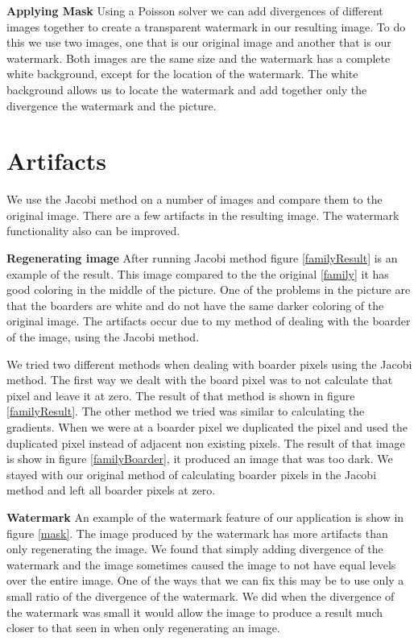 \documentclass[10pt,twopage]{acmsiggraph}
\begin{document}
{\bf Applying Mask} Using a Poisson solver we can add divergences of different images together to create a transparent watermark in our resulting image. To do this we use two images, one that is our original image and another that is our watermark. Both images are the same size and the watermark has a complete white background, except for the location of the watermark. The white background allows us to locate the watermark and add together only the divergence the watermark and the picture.

\section{Artifacts}

We use the Jacobi method on a number of images and compare them to the original image. There are a few artifacts in the resulting image. The watermark functionality also can be improved. 

{\bf Regenerating image} After running Jacobi method figure \ref{familyResult} is an example of the result. This image compared to the the original \ref{family} it has good coloring in the middle of the picture. One of the problems in the picture are that the boarders are white and do not have the same darker coloring of the original image. The artifacts occur due to my method of dealing with the boarder of the image, using the Jacobi method.

We tried two different methods when dealing with boarder pixels using the Jacobi method. The first way we dealt with the board pixel was to not calculate that pixel and leave it at zero. The result of that method is shown in figure \ref{familyResult}. The other method we tried was similar to calculating the gradients. When we were at a boarder pixel we duplicated the pixel and used the duplicated pixel instead of adjacent non existing pixels. The result of that image is show in figure \ref{familyBoarder}, it produced an image that was too dark. We stayed with our original method of calculating boarder pixels in the Jacobi method and left all boarder pixels at zero. 

{\bf Watermark} An example of the watermark feature of our application is show in figure \ref{mask}. The image produced by the watermark has more artifacts than only regenerating the image. We found that simply adding divergence of the watermark and the image sometimes caused the image to not have equal levels over the entire image. One of the ways that we can fix this may be to use only a small ratio of the divergence of the watermark. We did when the divergence of the watermark was small it would allow the image to produce a result much closer to that seen in when only regenerating an image.
\end{document}
